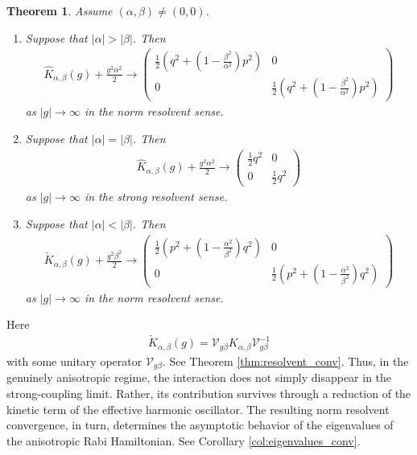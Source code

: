 \documentclass[12pt,dvipdfmx]{article}
\newtheorem*{theorem*}{Theorem}
\begin{document}
\begin{theorem*}
Assume $(\alpha,\beta)\ne(0,0)$.
\begin{enumerate}
\item[(1)] Suppose that $|\alpha|>|\beta|$.
Then 
\begin{align*}
         \hat{K}_{\alpha,\beta}(g) 
        +
        \frac{g^2 \alpha^2}{2}
    \longrightarrow 
    \begin{pmatrix}
        \frac12 \left(q^2 + \left(1 - \frac{\beta^2}{\alpha^2}\right) p^2\right) & 0\\
        0 & \frac12 \left(q^2 + \left(1 - \frac{\beta^2}{\alpha^2}\right) p^2\right)
    \end{pmatrix}
\end{align*}
as $|g|\to\infty$ in the norm resolvent sense.

\item[(2)] Suppose that $|\alpha|=|\beta|$. Then
\begin{align*}
         \hat{K}_{\alpha,\beta}(g) 
        +
        \frac{g^2 \alpha^2}{2}
    \longrightarrow 
    \begin{pmatrix}
        \frac12 q^2 & 0\\
        0 & \frac12 q^2
    \end{pmatrix}
\end{align*}
as $|g|\to\infty$ in the strong resolvent sense.

\item[(3)] Suppose that $|\alpha|<|\beta|$. 
Then 
\begin{align*}
         \check{K}_{\alpha,\beta}(g) 
        +
        \frac{g^2 \beta^2}{2}
\longrightarrow 
    \begin{pmatrix}
        \frac12 \left(p^2 + \left(1 - \frac{\alpha^2}{\beta^2}\right) q^2\right) & 0\\
        0 & \frac12 \left(p^2 + \left(1 - \frac{\alpha^2}{\beta^2}\right) q^2\right)
    \end{pmatrix}
\end{align*}
as $|g|\to\infty$ in the norm resolvent sense.
\end{enumerate}
\end{theorem*}
Here 
\begin{align*}\check{K}_{\alpha,\beta}(g)=
\mathcal{V} _{g\beta} K_{\alpha,\beta}\mathcal{V} _{g\beta}^{-1}
\end{align*} 
with some unitary operator $\mathcal{V} _{g\beta}$.  
See Theorem \ref{thm:resolvent_conv}. 
Thus, in the genuinely anisotropic regime, the interaction does not simply disappear in the strong-coupling limit. Rather, its contribution survives through a reduction of the kinetic term of the effective harmonic oscillator. The resulting norm resolvent convergence, in turn, determines the asymptotic behavior of the eigenvalues of the anisotropic Rabi Hamiltonian. See Corollary \ref{col:eigenvalues_conv}. 
\end{document}

